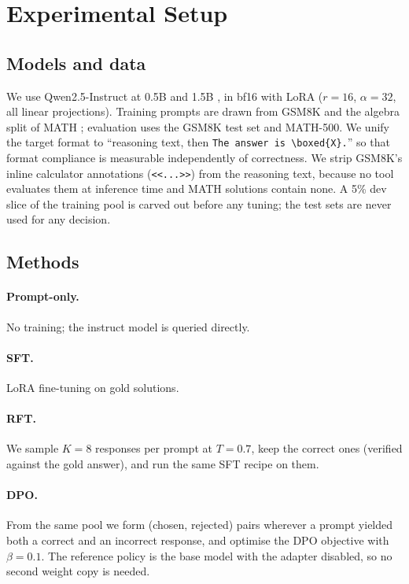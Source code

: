 \documentclass[11pt]{article}
\begin{document}
\section{Experimental Setup}

\subsection{Models and data}
We use Qwen2.5-Instruct at 0.5B and 1.5B \cite{qwen2024qwen25}, in bf16 with
LoRA \cite{hu2021lora} ($r{=}16$, $\alpha{=}32$, all linear projections).
Training prompts are drawn from GSM8K \cite{cobbe2021gsm8k} and the algebra
split of MATH \cite{hendrycks2021math}; evaluation uses the GSM8K test set and
MATH-500. We unify the target format to ``reasoning text, then
\texttt{The answer is \textbackslash boxed\{X\}.}'' so that format compliance is
measurable independently of correctness. We strip GSM8K's inline calculator
annotations (\texttt{<{}<...>{}>}) from the reasoning text, because no tool
evaluates them at inference time and MATH solutions contain none. A 5\% dev
slice of the training pool is carved out before any tuning; the test sets are
never used for any decision.

\subsection{Methods}
\paragraph{Prompt-only.} No training; the instruct model is queried directly.

\paragraph{SFT.} LoRA fine-tuning on gold solutions.

\paragraph{RFT.} We sample $K{=}8$ responses per prompt at
$T{=}0.7$, keep the correct ones (verified against the gold answer), and run
the same SFT recipe on them.

\paragraph{DPO.} From the same pool we form (chosen, rejected) pairs wherever a
prompt yielded both a correct and an incorrect response, and optimise the DPO
objective \cite{rafailov2023dpo} with $\beta{=}0.1$. The reference policy is
the base model with the adapter disabled, so no second weight copy is needed.
\end{document}
